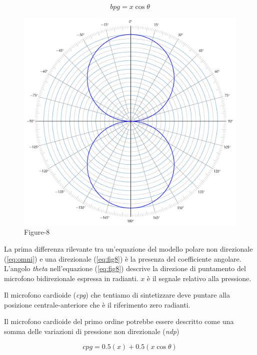 \begin{equation}
bpg = x\cos\theta
\label{eq:fig8}
\end{equation}

\begin{figure}[t]
\centering
\includegraphics[width=1\columnwidth]{CAPITOLI/_TIKZ/POLAR/fig8}
\caption{Figure-8}
\label{polar:fig8}
\end{figure}

La prima differenza rilevante tra un'equazione del modello polare non
direzionale (\ref{eq:omni}) e una direzionale (\ref{eq:fig8}) è la
presenza del coefficiente angolare. L'angolo \emph{theta} nell'equazione
(\ref{eq:fig8}) descrive la direzione di puntamento del microfono bidirezionale
espressa in radianti. $x$ è il segnale relativo alla pressione.

Il microfono cardioide (\emph{cpg}) che tentiamo di sintetizzare deve puntare
alla posizione centrale-anteriore che è il riferimento zero radianti.

Il microfono cardioide del primo ordine potrebbe essere descritto come una somma delle
variazioni di pressione non direzionale (\emph{ndp})


\begin{equation}
cpg = 0.5(x) + 0.5(x\cos\theta)
\label{eq:cardioid}
\end{equation}

